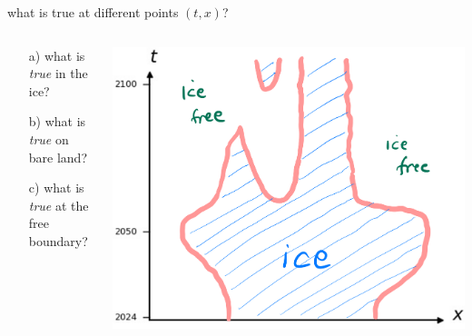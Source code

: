 \documentclass[10pt,dvipsnames]{beamer}
\begin{document}
\begin{frame}{what is true at different points $(t,x)$?}

\bigskip \bigskip

\begin{columns}
\begin{column}{0.26\textwidth}
\begin{itemize}
\item[a)] what is \emph{true} in the ice?
\item[b)] what is \emph{true} on bare land?
\item[c)] what is \emph{true} at the free boundary?
\end{itemize}\end{column}
\begin{column}{0.74\textwidth}
\hfill \includegraphics[width=\textwidth]{xtcrop}
\end{column}
\end{columns}
\end{frame}
\end{document}
